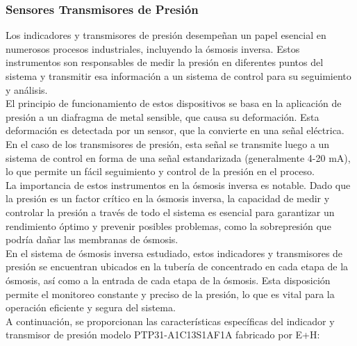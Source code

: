 \subsubsection{Sensores Transmisores de Presión}

Los indicadores y transmisores de presión desempeñan un papel esencial en numerosos procesos industriales, incluyendo la ósmosis inversa. Estos instrumentos son responsables de medir la presión en diferentes puntos del sistema y transmitir esa información a un sistema de control para su seguimiento y análisis.\\

El principio de funcionamiento de estos dispositivos se basa en la aplicación de presión a un diafragma de metal sensible, que causa su deformación. Esta deformación es detectada por un sensor, que la convierte en una señal eléctrica. En el caso de los transmisores de presión, esta señal se transmite luego a un sistema de control en forma de una señal estandarizada (generalmente 4-20 mA), lo que permite un fácil seguimiento y control de la presión en el proceso.\\

La importancia de estos instrumentos en la ósmosis inversa es notable. Dado que la presión es un factor crítico en la ósmosis inversa, la capacidad de medir y controlar la presión a través de todo el sistema es esencial para garantizar un rendimiento óptimo y prevenir posibles problemas, como la sobrepresión que podría dañar las membranas de ósmosis.\\

En el sistema de ósmosis inversa estudiado, estos indicadores y transmisores de presión se encuentran ubicados en la tubería de concentrado en cada etapa de la ósmosis, así como a la entrada de cada etapa de la ósmosis. Esta disposición permite el monitoreo constante y preciso de la presión, lo que es vital para la operación eficiente y segura del sistema.\\

A continuación, se proporcionan las características específicas del indicador y transmisor de presión modelo PTP31-A1C13S1AF1A fabricado por E+H:\\

